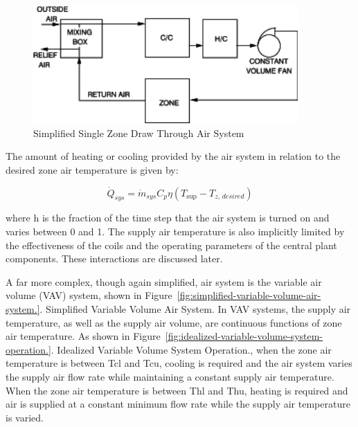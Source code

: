 \begin{figure}[hbtp] %
\centering
\includegraphics[width=0.9\textwidth, height=0.9\textheight, keepaspectratio=true]{media/image31.svg.png}
\caption{Simplified Single Zone Draw Through Air System \protect \label{fig:simplified-single-zone-draw-through-air}}
\end{figure}

The amount of heating or cooling provided by the air system in relation to the desired zone air temperature is given by:

\begin{equation}
{\dot Q_{sys}} = {\dot m_{sys}}{C_p}\eta \left( {{T_{\sup }} - {T_{z,\,desired}}} \right)
\end{equation}

where h is the fraction of the time step that the air system is turned on and varies between 0 and 1. The supply air temperature is also implicitly limited by the effectiveness of the coils and the operating parameters of the central plant components. These interactions are discussed later.

A far more complex, though again simplified, air system is the variable air volume (VAV) system, shown in Figure~\ref{fig:simplified-variable-volume-air-system.}. Simplified Variable Volume Air System. In VAV systems, the supply air temperature, as well as the supply air volume, are continuous functions of zone air temperature. As shown in Figure~\ref{fig:idealized-variable-volume-system-operation.}. Idealized Variable Volume System Operation., when the zone air temperature is between Tcl and Tcu, cooling is required and the air system varies the supply air flow rate while maintaining a constant supply air temperature. When the zone air temperature is between Thl and Thu, heating is required and air is supplied at a constant minimum flow rate while the supply air temperature is varied.


